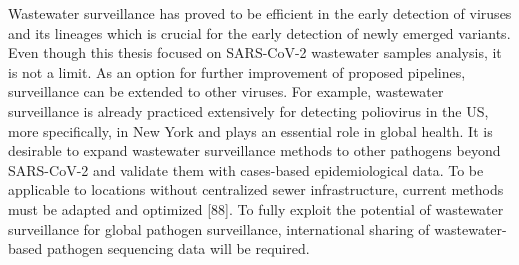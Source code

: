 Wastewater surveillance has proved to be efficient in the early detection of viruses and its lineages which is crucial for the early detection of newly emerged variants. Even though this thesis focused on SARS-CoV-2 wastewater samples analysis, it is not a limit. As an option for further improvement of proposed pipelines, surveillance can be extended to other viruses. For example, wastewater surveillance is already practiced extensively for detecting poliovirus in the US, more specifically, in New York \cite{russo2022} and plays an essential role in global health. It is desirable to expand wastewater surveillance methods to other pathogens beyond SARS-CoV-2 and validate them with cases-based epidemiological data. To be applicable to locations without centralized sewer infrastructure, current methods must be adapted and optimized [88]. To fully exploit the potential of wastewater surveillance for global pathogen surveillance, international sharing of wastewater-based pathogen sequencing data will be required.

\clearpage
